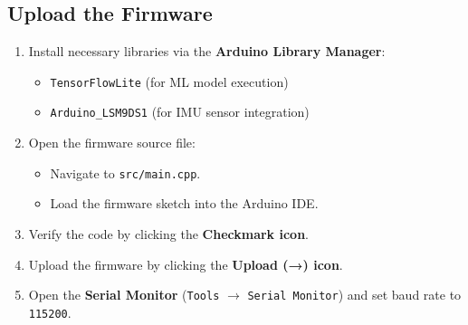 \subsection{Upload the Firmware}
\begin{enumerate}
	\item Install necessary libraries via the \textbf{Arduino Library Manager}:
	\begin{itemize}
		\item \texttt{TensorFlowLite} (for ML model execution)
		\item \texttt{Arduino\_LSM9DS1} (for IMU sensor integration)
	\end{itemize}
	\item Open the firmware source file:
	\begin{itemize}
		\item Navigate to \texttt{src/main.cpp}.
		\item Load the firmware sketch into the Arduino IDE.
	\end{itemize}
	\item Verify the code by clicking the \textbf{Checkmark icon}.
	\item Upload the firmware by clicking the \textbf{Upload (→) icon}.
	\item Open the \textbf{Serial Monitor} (\texttt{Tools} $\to$ \texttt{Serial Monitor}) and set baud rate to \texttt{115200}.
\end{enumerate}


